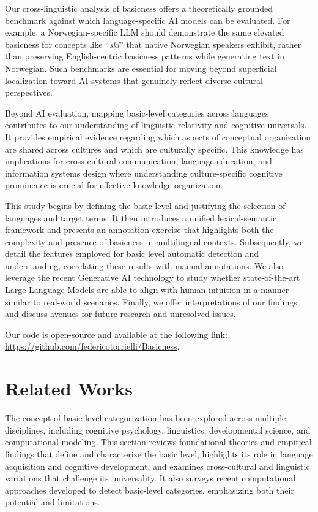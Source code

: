 \documentclass[preprint,12pt,authoryear]{elsarticle}
\begin{document}
Our cross-linguistic analysis of basicness offers a theoretically grounded benchmark against which language-specific AI models can be evaluated. For example, a Norwegian-specific LLM should demonstrate the same elevated basicness for concepts like ``\textit{ski}'' that native Norwegian speakers exhibit, rather than preserving English-centric basicness patterns while generating text in Norwegian.
Such benchmarks are essential for moving beyond superficial localization toward AI systems that genuinely reflect diverse cultural perspectives.

Beyond AI evaluation, mapping basic-level categories across languages contributes to our understanding of linguistic relativity and cognitive universals. It provides empirical evidence regarding which aspects of conceptual organization are shared across cultures and which are culturally specific. This knowledge has implications for cross-cultural communication, language education, and information systems design where understanding culture-specific cognitive prominence is crucial for effective knowledge organization.

This study begins by defining the basic level and  justifying the selection of languages and target terms. It then introduces a unified lexical-semantic framework and presents an annotation exercise that highlights both the complexity and presence of basicness in multilingual contexts. Subsequently, we detail the features employed for basic level automatic detection and understanding, correlating these results with manual annotations. We also leverage the recent Generative AI technology to study whether state-of-the-art Large Language Models are able to align with human intuition in a manner similar to real-world scenarios.
Finally, we offer interpretations of our findings and discuss avenues for future research and unresolved issues.

Our code is open-source and available at the following link: \url{https://github.com/federicotorrielli/Basicness}.

\section{Related Works}
\label{sec:related}

The concept of basic-level categorization has been explored across multiple disciplines, including cognitive psychology, linguistics, developmental science, and computational modeling. This section reviews foundational theories and empirical findings that define and characterize the basic level, highlights its role in language acquisition and cognitive development, and examines cross-cultural and linguistic variations that challenge its universality. It also surveys recent computational approaches developed to detect basic-level categories, emphasizing both their potential and limitations.
\end{document}
